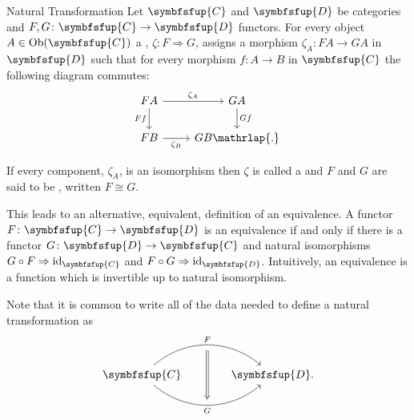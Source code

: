 \documentclass[fleqn]{NotesClass}
\newcommand{\cat}[1]{\symbfsfup{#1}}
\DeclareMathOperator{\Ob}{Ob}
\DeclareMathOperator{\id}{id}
\newcommand{\isomorphic}{\cong}
\newcommand{\naturalTransformation}{\Rightarrow}
\begin{document}
    \begin{dfn}{Natural Transformation}{}
        Let \(\cat{C}\) and \(\cat{D}\) be categories and \(F, G \colon \cat{C} \to \cat{D}\) functors.
        For every object \(A \in \Ob(\cat{C})\) a , \(\zeta \colon F \naturalTransformation G\), assigns a morphism \(\zeta_A \colon FA \to GA\) in \(\cat{D}\) such that for every morphism \(f \colon A \to B\) in \(\cat{C}\) the following diagram commutes:
        \begin{equation}
            \begin{tikzcd}
                FA \arrow[r, "\zeta_A"] \arrow[d, "Ff"'] & GA \arrow[d, "Gf"]\\
                FB \arrow[r, "\zeta_B"'] & GB\mathrlap{.}
            \end{tikzcd}
        \end{equation}
        
        If every component, \(\zeta_A\), is an isomorphism then \(\zeta\) is called a  and \(F\) and \(G\) are said to be , written \(F \isomorphic G\).
    \end{dfn}
    
    This leads to an alternative, equivalent, definition of an equivalence.
    A functor \(F \colon \cat{C} \to \cat{D}\) is an equivalence if and only if there is a functor \(G \colon \cat{D} \to \cat{C}\) and natural isomorphisms \(G \circ F \naturalTransformation \id_{\cat{C}}\) and \(F \circ G \naturalTransformation \id_{\cat{D}}\).
    Intuitively, an equivalence is a function which is invertible up to natural isomorphism.
    
    Note that it is common to write all of the data needed to define a natural transformation as
    \begin{equation}
        \begin{tikzcd}[column sep=large]
            \cat{C}
            \arrow[r, "F"{name=F}, bend left=40]
            \arrow[r, "G"{name=G, swap}, bend right=40]
            & \cat{D}.
            \arrow[Rightarrow, from=F.south, to=G.north-|F, shorten <=5pt, shorten >=5pt]
        \end{tikzcd}
    \end{equation}
    
\end{document}
